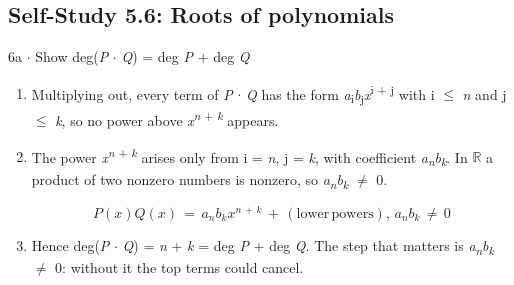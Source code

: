 \documentclass[11pt]{article}
\begin{document}
\begin{keepsection}\subsection{Self-Study 5.6: Roots of polynomials}

\begin{workedbox}{6a \ensuremath{\cdot} Show deg(\textit{P} \ensuremath{\cdot} \textit{Q}) = deg \textit{P} + deg \textit{Q}}
\begin{enumerate}
\item Multiplying out, every term of \textit{P} \ensuremath{\cdot} \textit{Q} has the form \textit{a}\textsubscript{i}\textit{b}\textsubscript{j}\textit{x}\textsuperscript{i + j} with i \ensuremath{\leq} \textit{n} and j \ensuremath{\leq} \textit{k}, so no power above \textit{x}\textsuperscript{\textit{n} + \textit{k}} appears.
\item {}
The power \textit{x}\textsuperscript{\textit{n} + \textit{k}} arises only from i = \textit{n}, j = \textit{k}, with coefficient \textit{a}\textsubscript{\textit{n}}\textit{b}\textsubscript{\textit{k}}. In \ensuremath{\mathbb{R}} a product of two nonzero numbers is nonzero, so \textit{a}\textsubscript{\textit{n}}\textit{b}\textsubscript{\textit{k}} \ensuremath{\neq} 0.

\begin{equation*}{P}({x}){Q}({x})\, =\, {a}_{{n}}{b}_{{k}}{x}^{{n}\, +\, {k}}\, +\, (\text{lower}\, \text{powers}),\, {a}_{{n}}{b}_{{k}}\, ≠\, 0\end{equation*}
\item Hence deg(\textit{P} \ensuremath{\cdot} \textit{Q}) = \textit{n} + \textit{k} = deg \textit{P} + deg \textit{Q}. The step that matters is \textit{a}\textsubscript{\textit{n}}\textit{b}\textsubscript{\textit{k}} \ensuremath{\neq} 0: without it the top terms could cancel.
\end{enumerate}
\end{workedbox}

\end{keepsection}
\end{document}
